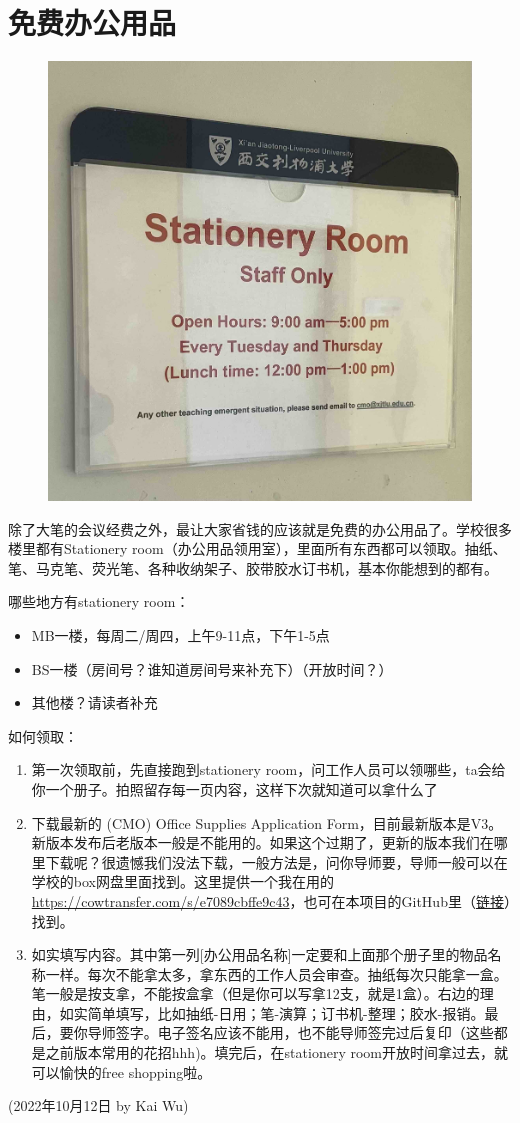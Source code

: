 \section{免费办公用品}
\begin{figure}[H]
    \centering
    \includegraphics[width=0.6\columnwidth]{author-folder/Kai.Wu/stationery_room.jpg}
\end{figure}

除了大笔的会议经费之外，最让大家省钱的应该就是免费的办公用品了。学校很多楼里都有Stationery room（办公用品领用室），里面所有东西都可以领取。抽纸、笔、马克笔、荧光笔、各种收纳架子、胶带胶水订书机，基本你能想到的都有。

\vspace{5mm}
哪些地方有stationery room：
\begin{itemize}
    \item MB一楼，每周二/周四，上午9-11点，下午1-5点
    \item BS一楼（房间号？谁知道房间号来补充下）（开放时间？）
    \item 其他楼？请读者补充
\end{itemize}

\vspace{5mm}
如何领取：
\begin{enumerate}
    \item 第一次领取前，先直接跑到stationery room，问工作人员可以领哪些，ta会给你一个册子。拍照留存每一页内容，这样下次就知道可以拿什么了
    \item 下载最新的 (CMO) Office Supplies Application Form，目前最新版本是V3。新版本发布后老版本一般是不能用的。如果这个过期了，更新的版本我们在哪里下载呢？很遗憾我们没法下载，一般方法是，问你导师要，导师一般可以在学校的box网盘里面找到。这里提供一个我在用的 \url{https://cowtransfer.com/s/e7089cbffe9c43}，也可在本项目的GitHub里（\href{https://github.com/kaiwu-astro/xp_pgrs_unofficial_guide/tree/main/fileshare}{链接}）找到。
    \item 如实填写内容。其中第一列[办公用品名称]一定要和上面那个册子里的物品名称一样。每次不能拿太多，拿东西的工作人员会审查。抽纸每次只能拿一盒。笔一般是按支拿，不能按盒拿（但是你可以写拿12支，就是1盒）。右边的理由，如实简单填写，比如抽纸-日用；笔-演算；订书机-整理；胶水-报销。最后，要你导师签字。电子签名应该不能用，也不能导师签完过后复印（这些都是之前版本常用的花招hhh)。填完后，在stationery room开放时间拿过去，就可以愉快的free shopping啦。
\end{enumerate}


\begin{flushright}
(2022年10月12日 by Kai Wu)
\end{flushright}